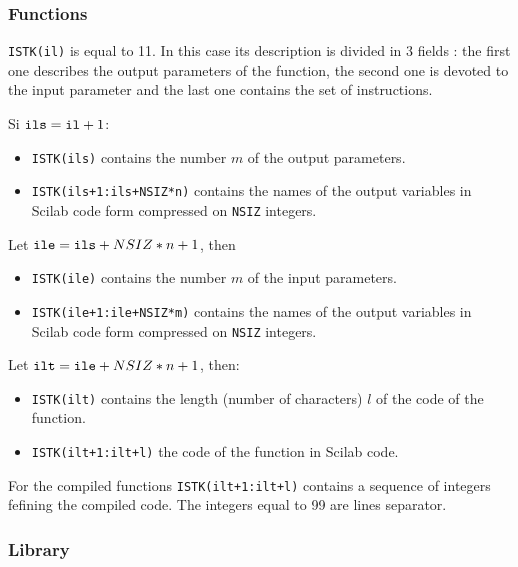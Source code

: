 \subsubsection{Functions}
{\tt ISTK(il)} is equal to 11. In this case its description is divided in
3 fields : the first one describes the output parameters of the function,
the second one is devoted to the input parameter and the last one contains
the set of instructions.

Si ${\tt ils}={\tt il}+1$:

\begin{itemize}

\item{\tt ISTK(ils)} contains the number $m$ of the output parameters.

\item{\tt ISTK(ils+1:ils+NSIZ*n)}   contains the names of the output variables
in Scilab code form compressed on {\tt NSIZ} integers.

\end{itemize}

Let ${\tt ile}={\tt ils}+NSIZ*n+1$, then

\begin{itemize}

\item{\tt ISTK(ile)} contains the number $m$ of the input parameters.

\item {\tt ISTK(ile+1:ile+NSIZ*{\mit m})}   contains the names of the output 
variables in Scilab code form compressed on {\tt NSIZ} integers.

\end{itemize}

Let ${\tt ilt}={\tt ile}+NSIZ*n+1$, then:

\begin{itemize}

\item{\tt   ISTK(ilt)}  contains the length (number of characters) $l$
of the code of the function.

\item{\tt ISTK(ilt+1:ilt+l)} the code of the function in Scilab code.

\end{itemize}

For the compiled functions \verb!ISTK(ilt+1:ilt+l)!   contains
a sequence of integers fefining the compiled code. The integers equal to
99 are lines separator.

\subsubsection{Library}


